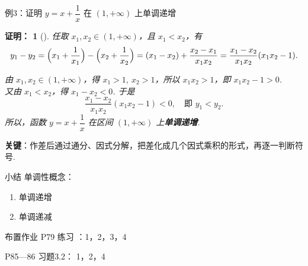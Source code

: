 \documentclass[aspectratio=169,13pt,t] {beamer}
\newtheorem*{prooft}{证明：}
\theoremstyle{definition}
\begin{document}
\begin{frame}{例3：证明 \(y=x+\dfrac{1}{x}\) 在 \((1,+\infty)\) 上单调递增}
	\pause
	\vspace{-1em}
	\begin{prooft}[]
	任取 \(x_1,x_2\in(1,+\infty)\)，且 \(x_1<x_2\)，有
	\[
		y_1-y_2=\Bigl(x_1+\frac{1}{x_1}\Bigr)-\Bigl(x_2+\frac{1}{x_2}\Bigr)
		=(x_1-x_2)+\frac{x_2-x_1}{x_1x_2}
		=\frac{x_1-x_2}{x_1x_2}(x_1x_2-1).
	\]
	
	\pause
	由 \(x_1,x_2\in(1,+\infty)\)，得 \(x_1>1,\ x_2>1\)，所以 \(x_1x_2>1\)，即 \(x_1x_2-1>0\).\\
	又由 \(x_1<x_2\)，得 \(x_1-x_2<0\). 于是
	\[
	\frac{x_1-x_2}{x_1x_2}(x_1x_2-1)<0,\quad\text{即 } y_1<y_2.
	\]
	\pause
	所以，函数 \(y=x+\dfrac{1}{x}\) 在区间 \((1,+\infty)\) 上\textbf{单调递增}.
	\end{prooft}
	
	\pause
	\begin{summarybox-answer}
		\textbf{关键}：作差后通过通分、因式分解，把差化成几个因式乘积的形式，再逐一判断符号.
	\end{summarybox-answer}
\end{frame}



\begin{frame}{小结}
	单调性概念：
	\begin{enumerate}[(1)]
		\item<2-> 单调递增
		\item<3-> 单调递减
	\end{enumerate}
\end{frame}

\begin{frame}{布置作业}
	P79 练习 ：1，2，3，4
	
	P85---86 习题3.2： 1，2，4
\end{frame}
\end{document}
